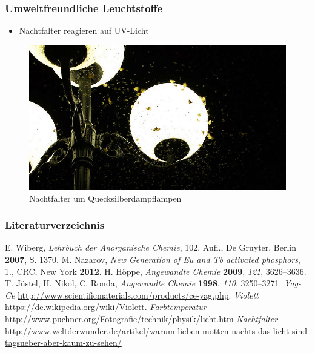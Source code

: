 \documentclass{beamer}
\begin{document}
\begin{frame}[t]\frametitle{Umweltfreundliche Leuchtstoffe }
  \begin{itemize}
    \item Nachtfalter reagieren auf UV-Licht
  \end{itemize}
  
\begin{figure}[!h]
\centering
      \includegraphics[scale=0.3]{pics/schwarm.jpg}
      \caption*{\footnotesize Nachtfalter um Quecksilberdampflampen }
 \end{figure}


\end{frame}





\begin{frame}[t]\frametitle{Literaturverzeichnis}
    

\begin{thebibliography}{9}
E. Wiberg, \emph{Lehrbuch der Anorganische Chemie}, 102. Aufl., De Gruyter, Berlin \textbf{2007}, S. 1370.
M. Nazarov, \emph{New Generation of Eu and Tb activated phosphors}, 1., CRC, New York \textbf{2012}.
H. Höppe, \textit{Angewandte Chemie} \textbf{2009}, \textit{121}, 3626–3636.
 T. Jüstel, H. Nikol, C. Ronda, \textit{Angewandte Chemie} \textbf{1998}, \textit{110}, 3250–3271.
\emph{Yag-Ce}
 \url{http://www.scientificmaterials.com/products/ce-yag.php}.
\emph{Violett}
 \url{https://de.wikipedia.org/wiki/Violett}.
\emph{Farbtemperatur}
\url{http://www.puchner.org/Fotografie/technik/physik/licht.htm}
\emph{Nachtfalter}
\url{http://www.weltderwunder.de/artikel/warum-lieben-motten-nachts-das-licht-sind-tagsueber-aber-kaum-zu-sehen/}
\end{thebibliography}
  
\end{frame}


\end{document}
